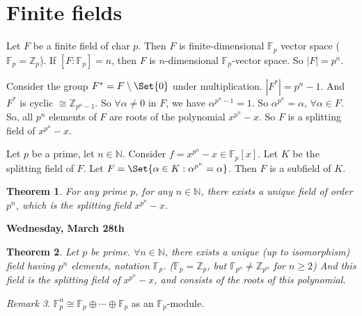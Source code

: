 \documentclass[9pt,reqno,twoside]{amsbook}
\theoremstyle{plain}
\newtheorem{theorem}{Theorem}[chapter]
\numberwithin{section}{chapter}
\numberwithin{equation}{chapter}
\theoremstyle{definition}
\theoremstyle{remark}
\newtheorem{rem}[theorem]{Remark}
\theoremstyle{plain}
\newcommand{\z}{\mathbb{Z}}
\newcommand{\n}{\mathbb{N}}
\newcommand{\F}{\mathbb{F}}
\newcommand{\bb}{\vspace{3mm}}
\renewcommand{\geq}{\geqslant}
\begin{document}
\setcounter{section}{2}
\section{Finite fields}

Let $F$ be a finite field of char $p$. Then $F$ is finite-dimensional $\F_p$ vector space ($\F_p = \z_p$). If $[F:\F_p] = n$, then $F$ is $n$-dimensional $\F_p$-vector space. So $|F| = p^n$. 


Consider the group $F^*  = F\setminus \Set{0}$ under multiplication. $|F^*| = p^n - 1$. And $F^*$ is cyclic $\cong \z_{p^n - 1}$. So $\forall \alpha \neq 0$ in $F$, we have $\alpha^{p^n - 1} = 1$. So $\alpha^{p^n}
 = \alpha$, $\forall \alpha \in F$. So, all $p^n$ elements of $F$ are roots of the polynomial $x^{p^n} - x$. So $F$ is a splitting field of $x^{p^n} - x$. 
 
 
 Let $p$ be a prime, let $n \in \n$. Consider $f = x^{p^n} - x \in \F_p[x]$. Let $K$ be the splitting field of $F$. Let $F = \Set{\alpha \in K: \alpha^{p^n} = \alpha}$. Then $F$ is a subfield of $K$. 


\begin{theorem}
For any prime $p$, for any $n \in \n$, there exists a unique field of order $p^n$, which is the splitting field $x^{p^n} - x$. 
\end{theorem}


\bb

\textbf{Wednesday, March 28th}


\begin{theorem}
Let $p$ be prime. $\forall n \in \n$, there exists a unique (up to isomorphism) field having $p^n$ elements, notation $\F_p$. ($\F_p = \z_p$, but $\F_{p^n} \neq \z_{p^n}$ for $n \geq 2$) And this field is the splitting field of $x^{p^n} - x$, and consists of the roots of this polynomial. 
\end{theorem}

\begin{rem}
$\F_p^n \cong \F_p \oplus \cdots \oplus \F_p$ as an $\F_p$-module. 
\end{rem}
\end{document}
